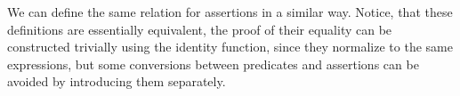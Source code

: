 We can define the same relation for assertions in a similar way. Notice, that these definitions are essentially equivalent, the proof of their equality can be constructed trivially using the identity function, since they normalize to the same expressions, but some conversions between predicates and assertions can be avoided by introducing them separately.

\begin{code}
    \>[2]\AgdaSpace{}%
    \AgdaSpace{}%
    \<%
    \\
    \>[2]\AgdaSpace{}%
    \AgdaSymbol{:}\AgdaSpace{}%
    \AgdaSpace{}%
    \AgdaSpace{}%
    \AgdaSpace{}%
    \AgdaSpace{}%
    \<%
    \\
    \>[2]\AgdaSpace{}%
    \AgdaSpace{}%
    \AgdaSpace{}%
    \AgdaSymbol{=}\AgdaSpace{}%
    \AgdaSpace{}%
    \AgdaSymbol{:}\AgdaSpace{}%
    \AgdaSymbol{\}}\AgdaSpace{}%
    \AgdaSpace{}%
    \AgdaSpace{}%
    \AgdaSpace{}%
    \AgdaSpace{}%
    \AgdaSpace{}%
    \AgdaSpace{}%
    \AgdaSpace{}%
    \<%
    \\
    \\[\AgdaEmptyExtraSkip]%
    \>[2]\AgdaSpace{}%
    \AgdaSpace{}%
    \<%
    \\
    \>[2]\AgdaSpace{}%
    \AgdaSymbol{:}\AgdaSpace{}%
    \AgdaSpace{}%
    \AgdaSpace{}%
    \AgdaSpace{}%
    \AgdaSpace{}%
    \<%
    \\
    \>[2]\AgdaSpace{}%
    \AgdaSpace{}%
    \AgdaSpace{}%
    \AgdaSymbol{=}\AgdaSpace{}%
    \AgdaSpace{}%
    \AgdaSpace{}%
    \<%
    \\
    \\[\AgdaEmptyExtraSkip]%

\end{code}
